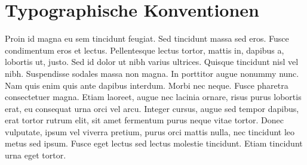 \section{Typographische Konventionen}
Proin id magna eu sem tincidunt feugiat. Sed tincidunt massa sed eros. Fusce condimentum eros et lectus. Pellentesque lectus tortor, mattis in, dapibus a, lobortis ut, justo. Sed id dolor ut nibh varius ultrices. Quisque tincidunt nisl vel nibh. Suspendisse sodales massa non magna. In porttitor augue nonummy nunc. Nam quis enim quis ante dapibus interdum. Morbi nec neque. Fusce pharetra consectetuer magna. Etiam laoreet, augue nec lacinia ornare, risus purus lobortis erat, eu consequat urna orci vel arcu. Integer cursus, augue sed tempor dapibus, erat tortor rutrum elit, sit amet fermentum purus neque vitae tortor. Donec vulputate, ipsum vel viverra pretium, purus orci mattis nulla, nec tincidunt leo metus sed ipsum. Fusce eget lectus sed lectus molestie tincidunt. Etiam tincidunt urna eget tortor.
